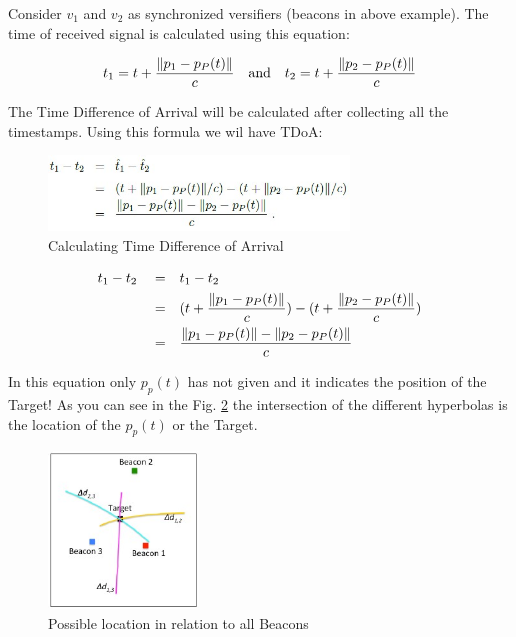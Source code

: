 Consider $v_1$ and $v_2$ as synchronized versifiers (beacons in above example). The time of received signal is calculated using this equation:

\begin{equation}
    \label{eqn:time_received_sig}
    t_1 = t + \frac{\norm{p_1-p_P(t)}}{c}
    \quad \text{and} \quad
    t_2 = t + \frac{\norm{p_2-p_P(t)}}{c}
\end{equation}

The Time Difference of Arrival will be calculated after collecting all the timestamps. Using this formula we wil have TDoA:


\begin{figure}[htp]
    \centering
    \includegraphics[width=8cm]{7.jpg}
    \caption{Calculating Time Difference of Arrival \cite{schaefer18}}
    \label{fig:formula}
\end{figure}
\begin{equation}
    \label{eqn:time_difference_arr}
    \begin{split}
        t_1 - t_2 \quad =& \quad t_1 - t_2 \\
        =& \quad (t+\frac{\norm{p_1-p_P(t)}}{c}) - (t+\frac{\norm{p_2-p_P(t)}}{c})\\
        =& \quad \frac{\norm{p_1-p_P(t)} - \norm{p_2-p_P(t)}}{c}
    \end{split}
\end{equation}

In this equation only $p_p(t)$ has not given and it indicates the position of the Target! As you can see in the Fig. \ref{fig:hyp_location} the intersection of the different hyperbolas is the location of the $p_p(t)$ or the Target. \cite{brian17}

\begin{figure}[htp]
    \centering
    \includegraphics[width=4cm]{8.jpg}
    \caption{Possible location in relation to all Beacons \cite{brian17}}
    \label{fig:hyp_location}
\end{figure}

